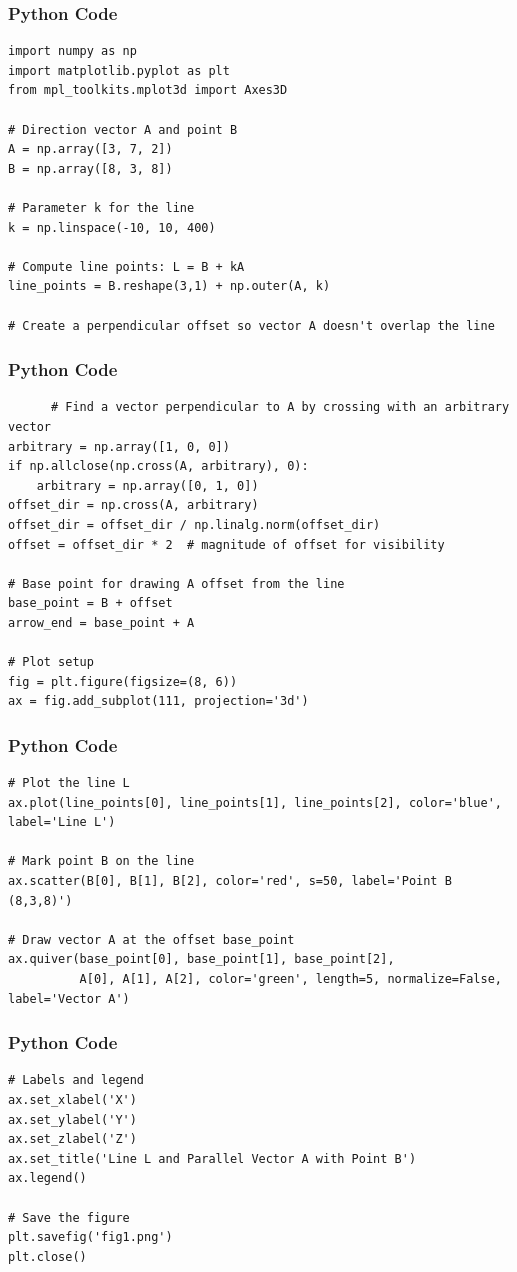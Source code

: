 \documentclass{beamer}
\begin{document}
\begin{frame}[fragile]
    \frametitle{Python Code}
    \begin{lstlisting}
import numpy as np
import matplotlib.pyplot as plt
from mpl_toolkits.mplot3d import Axes3D

# Direction vector A and point B
A = np.array([3, 7, 2])
B = np.array([8, 3, 8])

# Parameter k for the line
k = np.linspace(-10, 10, 400)

# Compute line points: L = B + kA
line_points = B.reshape(3,1) + np.outer(A, k)

# Create a perpendicular offset so vector A doesn't overlap the line
    \end{lstlisting}
\end{frame}

\begin{frame}[fragile]
    \frametitle{Python Code}
    \begin{lstlisting}
      # Find a vector perpendicular to A by crossing with an arbitrary vector
arbitrary = np.array([1, 0, 0])
if np.allclose(np.cross(A, arbitrary), 0):
    arbitrary = np.array([0, 1, 0])
offset_dir = np.cross(A, arbitrary)
offset_dir = offset_dir / np.linalg.norm(offset_dir)
offset = offset_dir * 2  # magnitude of offset for visibility

# Base point for drawing A offset from the line
base_point = B + offset
arrow_end = base_point + A

# Plot setup
fig = plt.figure(figsize=(8, 6))
ax = fig.add_subplot(111, projection='3d')
    \end{lstlisting}
\end{frame}

\begin{frame}[fragile]
    \frametitle{Python Code}
    \begin{lstlisting}
# Plot the line L
ax.plot(line_points[0], line_points[1], line_points[2], color='blue', label='Line L')

# Mark point B on the line
ax.scatter(B[0], B[1], B[2], color='red', s=50, label='Point B (8,3,8)')

# Draw vector A at the offset base_point
ax.quiver(base_point[0], base_point[1], base_point[2],
          A[0], A[1], A[2], color='green', length=5, normalize=False, label='Vector A')
    \end{lstlisting}
\end{frame}

\begin{frame}[fragile]
    \frametitle{Python Code}
    \begin{lstlisting}
# Labels and legend
ax.set_xlabel('X')
ax.set_ylabel('Y')
ax.set_zlabel('Z')
ax.set_title('Line L and Parallel Vector A with Point B')
ax.legend()

# Save the figure
plt.savefig('fig1.png')
plt.close()
    \end{lstlisting}
\end{frame}
\end{document}
